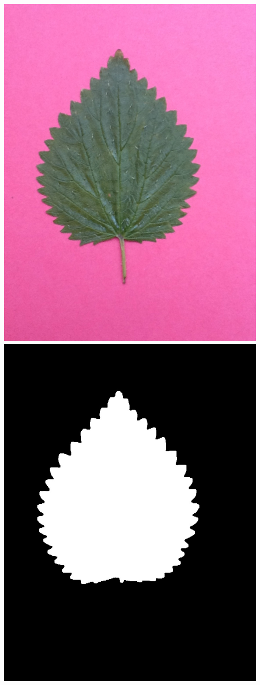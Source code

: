 \begin{center}
	\includegraphics[scale=0.11]{image/urticaRGB.png}	\includegraphics[scale=0.15]{image/urticaNB.png}
\end{center}
